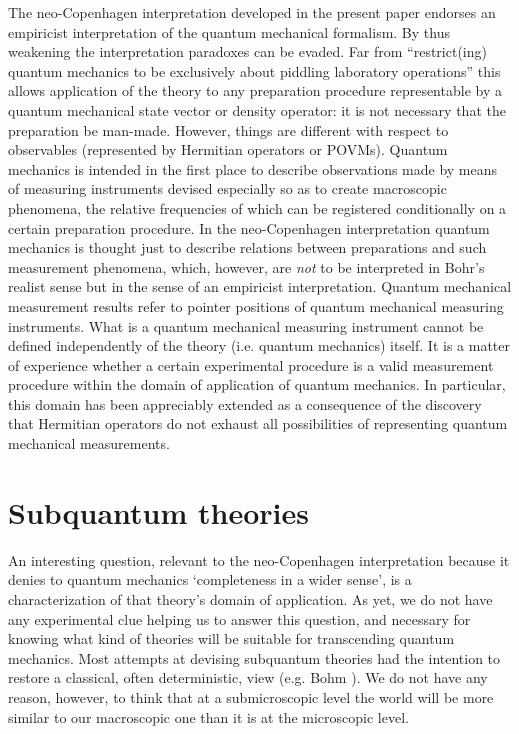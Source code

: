 \documentclass[12pt]{article}
\begin{document}
The neo-Copenhagen interpretation developed in the present paper
endorses an empiricist interpretation of the quantum mechanical
formalism. By thus weakening the interpretation paradoxes can be
evaded. Far from ``restrict(ing) quantum mechanics to be
exclusively about piddling laboratory operations'' this allows
application of the theory to any preparation procedure
representable by a quantum mechanical state vector or density
operator: it is not necessary that the preparation be man-made.
However, things are different with respect to observables
(represented by Hermitian operators or POVMs). Quantum mechanics
is intended in the first place to describe observations made by
means of measuring instruments devised especially so as to create macroscopic
phenomena, the relative frequencies of which can be registered
conditionally on a certain preparation procedure. In the
neo-Copenhagen interpretation quantum mechanics is thought just to
describe relations between preparations and such measurement
phenomena, which, however, are {\em not} to be interpreted in
Bohr's realist sense but in the sense of an empiricist
interpretation. Quantum mechanical measurement results refer to
pointer positions of quantum mechanical measuring instruments.
What is a quantum mechanical measuring instrument cannot be
defined independently of the theory (i.e. quantum mechanics)
itself. It is a matter of experience whether a certain
experimental procedure is a valid measurement procedure within the
domain of application of quantum mechanics. In particular, this
domain has been appreciably extended as a consequence of the
discovery that Hermitian operators do not exhaust all
possibilities of representing quantum mechanical measurements.
\section{Subquantum theories}\label{sec4}
An interesting question, relevant to the neo-Copenhagen
interpretation because it denies to quantum mechanics
`completeness in a wider sense', is a characterization of that
theory's domain of application. As yet, we do not have any
experimental clue helping us to answer this question, and
necessary for knowing what kind of theories will be suitable for
transcending quantum mechanics. Most attempts at devising
subquantum theories had the intention to restore a classical,
often deterministic, view (e.g. Bohm \cite{Bohm52}). We do not
have any reason, however, to think that at a submicroscopic level
the world will be more similar to our macroscopic one than it is
at the microscopic level.
\end{document}
